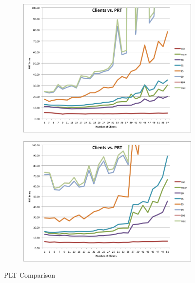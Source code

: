 \documentclass[conference]{IEEEtran}
\begin{document}
\begin{figure}[!h]
	\centering
	\begin{subfigure}[b]{0.49\columnwidth}
		\centering
		\includegraphics[width=\columnwidth]{figures/render.png}
	\end{subfigure}
	\begin{subfigure}[b]{0.49\columnwidth}
		\centering
		\includegraphics[width=\columnwidth]{figures/render_1.png}
	\end{subfigure}
	\caption{PLT Comparison}
\end{figure}



\end{document}
